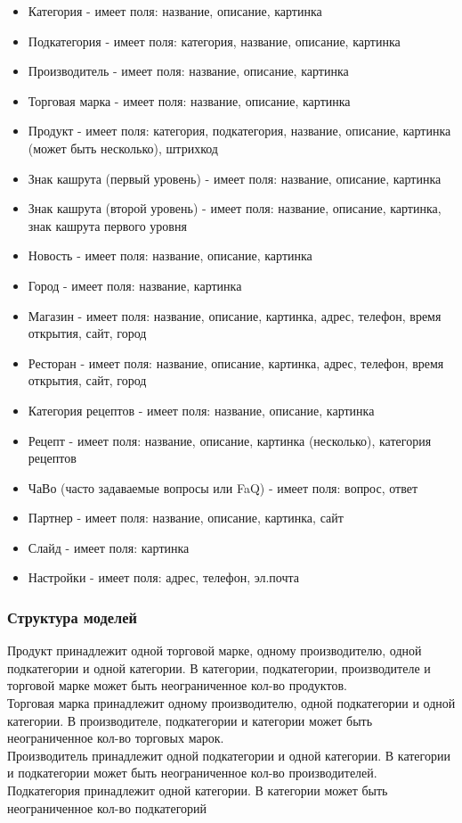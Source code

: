\documentclass[DIV=calc, paper=a4, fontsize=11pt]{scrartcl} %
\begin{document}
\begin{itemize}
	\item Категория - имеет поля: название, описание, картинка
	\item Подкатегория - имеет поля: категория, название, описание, картинка
	\item Производитель - имеет поля: название, описание, картинка
	\item Торговая марка - имеет поля: название, описание, картинка
	\item Продукт - имеет поля: категория, подкатегория, название, описание, картинка (может быть несколько), штрихкод
	\item Знак кашрута (первый уровень) - имеет поля: название, описание, картинка
	\item Знак кашрута (второй уровень) - имеет поля: название, описание, картинка, знак кашрута первого уровня
	\item Новость - имеет поля: название, описание, картинка
	\item Город - имеет поля: название, картинка
	\item Магазин - имеет поля: название, описание, картинка, адрес, телефон, время открытия, сайт, город
	\item Ресторан - имеет поля: название, описание, картинка, адрес, телефон, время открытия, сайт, город
	\item Категория рецептов - имеет поля: название, описание, картинка	
	\item Рецепт - имеет поля: название, описание, картинка (несколько), категория рецептов
	\item ЧаВо (часто задаваемые вопросы или FaQ) - имеет поля: вопрос, ответ
	\item Партнер - имеет поля: название, описание, картинка, сайт
	\item Слайд - имеет поля: картинка
	\item Настройки - имеет поля: адрес, телефон, эл.почта
\end{itemize}

\subsubsection{Структура моделей}

Продукт принадлежит одной торговой марке, одному производителю, одной подкатегории и одной категории.
В категории, подкатегории, производителе и торговой марке может быть неограниченное кол-во продуктов.
\\[0.5cm]
Торговая марка принадлежит одному производителю, одной подкатегории и одной категории.
В производителе, подкатегории и категории может быть неограниченное кол-во торговых марок.
\\[0.5cm]
Производитель принадлежит одной подкатегории и одной категории.
В категории и подкатегории может быть неограниченное кол-во производителей.
\\[0.5cm]
Подкатегория принадлежит одной категории.
В категории может быть неограниченное кол-во подкатегорий
\end{document}
